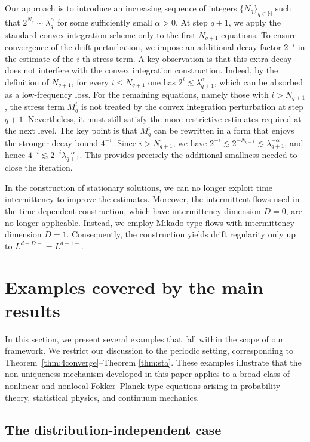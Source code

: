 \documentclass[UTF-8,reqno]{amsart}
\numberwithin{equation}{section}
\theoremstyle{definition}
\def\leq{\leqslant}
\def\leq{\leqslant}
\begin{document}
Our approach is to introduce an increasing sequence of integers
$\{N_q\}_{q\in\mathbb{N}}$ such that
$2^{N_q}\sim \lambda_q^\alpha$ for some sufficiently small $\alpha>0$.
At step $q+1$, we apply the standard convex integration scheme only to the first $N_{q+1}$ equations. To ensure convergence
of the drift perturbation, we impose an additional decay factor $2^{-i}$ in
the estimate of the $i$-th stress term. A key observation is that this extra
decay does not interfere with the convex integration construction. Indeed, by
the definition of $N_{q+1}$, for every $i\leq N_{q+1}$ one has
$2^i\lesssim \lambda_{q+1}^{\alpha}$, which can be absorbed
as a low-frequency loss.
For the remaining equations, namely those with $i>N_{q+1}$, the stress term
$M_q^i$ is not treated by the convex integration perturbation at step $q+1$.
Nevertheless, it must still satisfy the more restrictive estimates required at
the next level. The key point is that $M_q^i$ can be rewritten in a form that
enjoys the stronger decay bound $4^{-i}$. Since $i>N_{q+1}$, we have
$2^{-i}\lesssim 2^{-N_{q+1}}\lesssim \lambda_{q+1}^{-\alpha}$, and hence
$
4^{-i}
\lesssim
2^{-i}\lambda_{q+1}^{-\alpha}.
$
This provides precisely the additional smallness needed to close the
iteration.

In the construction of stationary solutions, we can no longer exploit time
intermittency to improve the estimates. Moreover, the intermittent flows used
in the time-dependent construction, which have intermittency dimension $D=0$,
are no longer applicable. Instead, we employ Mikado-type flows with
intermittency dimension $D=1$. Consequently, the construction yields drift
regularity only up to
$
L^{d-D-}=L^{d-1-}.
$

 


\section{Examples covered by the main results}\label{sec:example}

In this section, we present several examples that fall within the scope of our
framework. We restrict our discussion to the periodic setting, corresponding
to Theorem~\ref{thm:4converge}--Theorem \ref{thm:sta}. These examples illustrate
that the non-uniqueness mechanism developed in this paper applies to a broad
class of nonlinear and nonlocal Fokker--Planck-type equations arising in
probability theory, statistical physics, and continuum mechanics.

\subsection{The distribution-independent case}
\end{document}
